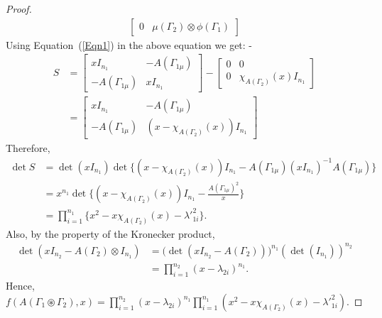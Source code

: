\documentclass[12pt,a4paper]{article}
\theoremstyle{definition}
\theoremstyle{remark}
\begin{document}
\begin{proof}
\begin{equation*}
\begin{split}
\begin{bmatrix}
                0& \mu(\Gamma_2)\otimes\phi(\Gamma_1)
            \end{bmatrix}
            \end{split}
        \end{equation*}
        Using Equation~(\ref{Eqn1}) in the above equation we get: -
        \begin{equation*}
            \begin{split}
            S&=\begin{bmatrix}
                xI_{n_1}& -A(\Gamma_{1\mu})\\
                -A(\Gamma_{1\mu})& xI_{n_1}
            \end{bmatrix}-\begin{bmatrix}
                0& 0\\
                0& \chi_{A(\Gamma_2)}(x)I_{n_1}
            \end{bmatrix}\\
            &=\begin{bmatrix}
                 xI_{n_1}& -A(\Gamma_{1\mu})\\
                -A(\Gamma_{1\mu})& (x-\chi_{A(\Gamma_2)}(x))I_{n_1}
            \end{bmatrix}
            \end{split}
        \end{equation*}
        Therefore,
        \begin{equation*}
            \begin{split}
                 \det S&=\det(xI_{n_1})\det\{(x-\chi_{A(\Gamma_2)}(x))I_{n_1}-A(\Gamma_{1\mu})(xI_{n_1})^{-1}A(\Gamma_{1\mu})\}\\
                &=x^{n_1}\det \{(x-\chi_{A(\Gamma_2)}(x))I_{n_1}-\frac{A(\Gamma_{1\mu})^2}{x}\}\\
                &=\prod_{i=1}^{n_1}\{x^2-x\chi_{A(\Gamma_2)}(x)-{\lambda'}_{1i}^2\}.
            \end{split}
        \end{equation*}
        Also, by the property of the Kronecker product,
        \begin{equation*}
            \begin{split}
                \det (xI_{n_2}-A(\Gamma_2)\otimes I_{n_1})&=\big(\det (xI_{n_2}-A(\Gamma_2))\big)^{n_1} (\det(I_{n_1}))^{n_2}\\
                &=\prod_{i=1}^{n_2}(x-\lambda_{2i})^{n_1}.
            \end{split}
        \end{equation*}
        Hence, $f(A(\Gamma_1\circledast\Gamma_2),x)=\prod_{i=1}^{n_2}(x-\lambda_{2i})^{n_1} \prod_{i=1}^{n_1}(x^2-x\chi_{A(\Gamma_2)}(x)-{\lambda'}_{1i}^2).$
        \end{proof}
\end{document}
